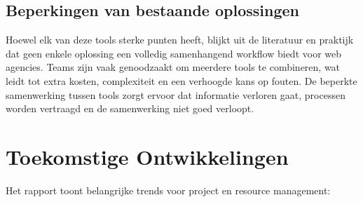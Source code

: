 \subsection{Beperkingen van bestaande oplossingen}
Hoewel elk van deze tools sterke punten heeft, blijkt uit de literatuur en praktijk dat geen enkele oplossing een volledig samenhangend workflow biedt voor web agencies. Teams zijn vaak genoodzaakt om meerdere tools te combineren, wat leidt tot extra kosten, complexiteit en een verhoogde kans op fouten. De beperkte samenwerking tussen tools zorgt ervoor dat informatie verloren gaat, processen worden vertraagd en de samenwerking niet goed verloopt.

\section{Toekomstige Ontwikkelingen}
\label{sec:toekomst}

Het \textcite{StateOfAgile2023} rapport toont belangrijke trends voor project en resource management:

